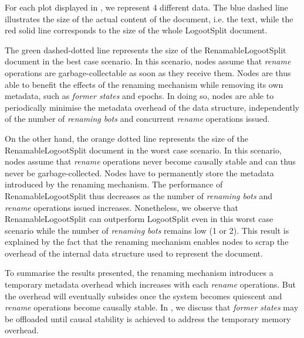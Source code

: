 \documentclass[10pt,journal,compsoc]{IEEEtran}
\newcommand{\ie}{i.e. }
\begin{document}
For each plot displayed in , we represent 4 different data.
The blue dashed line illustrates the size of the actual content of the document, \ie the text, while the red solid line corresponds to the size of the whole LogootSplit document.

The green dashed-dotted line represents the size of the RenamableLogootSplit document in the best case scenario.
In this scenario, nodes assume that \emph{rename} operations are garbage-collectable as soon as they receive them.
Nodes are thus able to benefit the effects of the renaming mechanism while removing its own metadata, such as \emph{former states} and epochs.
In doing so, nodes are able to periodically minimise the metadata overhead of the data structure, independently of the number of \emph{renaming bots} and concurrent \emph{rename} operations issued.

On the other hand, the orange dotted line represents the size of the RenamableLogootSplit document in the worst case scenario.
In this scenario, nodes assume that \emph{rename} operations never become causally stable and can thus never be garbage-collected.
Nodes have to permanently store the metadata introduced by the renaming mechanism.
The performance of RenamableLogootSplit thus decreases as the number of \emph{renaming bots} and \emph{rename} operations issued increases.
Nonetheless, we observe that RenamableLogootSplit can outperform LogootSplit even in this worst case scenario while the number of \emph{renaming bots} remains low (1 or 2).
This result is explained by the fact that the renaming mechanism enables nodes to scrap the overhead of the internal data structure used to represent the document.

To summarise the results presented, the renaming mechanism introduces a temporary metadata overhead which increases with each \emph{rename} operations.
But the overhead will eventually subsides once the system becomes quiescent and \emph{rename} operations become causally stable.
In , we discuss that \emph{former states} may be offloaded until causal stability is achieved to address the temporary memory overhead.
\end{document}
